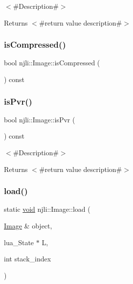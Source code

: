 $<$\#\+Description\#$>$

\begin{DoxyReturn}{Returns}
$<$\#return value description\#$>$ 
\end{DoxyReturn}
\mbox{\label{classnjli_1_1_image_a6639f89fa4b962afff9dfc6c6b242c64}} 
\subsubsection{\texorpdfstring{is\+Compressed()}{isCompressed()}}
{\footnotesize\ttfamily bool njli\+::\+Image\+::is\+Compressed (\begin{DoxyParamCaption}{ }\end{DoxyParamCaption}) const}

\mbox{\label{classnjli_1_1_image_a7db60904e8f2631b6d97762ec6202498}} 
\subsubsection{\texorpdfstring{is\+Pvr()}{isPvr()}}
{\footnotesize\ttfamily bool njli\+::\+Image\+::is\+Pvr (\begin{DoxyParamCaption}{ }\end{DoxyParamCaption}) const}

$<$\#\+Description\#$>$

\begin{DoxyReturn}{Returns}
$<$\#return value description\#$>$ 
\end{DoxyReturn}
\mbox{\label{classnjli_1_1_image_aedfe2aac8686b752e7f2a37d9c6c798b}} 
\subsubsection{\texorpdfstring{load()}{load()}}
{\footnotesize\ttfamily static \mbox{\hyperlink{_thread_8h_af1e856da2e658414cb2456cb6f7ebc66}{void}} njli\+::\+Image\+::load (\begin{DoxyParamCaption}\item[{\mbox{\hyperlink{classnjli_1_1_image}{Image}} \&}]{object,  }\item[{lua\+\_\+\+State $\ast$}]{L,  }\item[{int}]{stack\+\_\+index }\end{DoxyParamCaption})\hspace{0.3cm}{\ttfamily [static]}}

